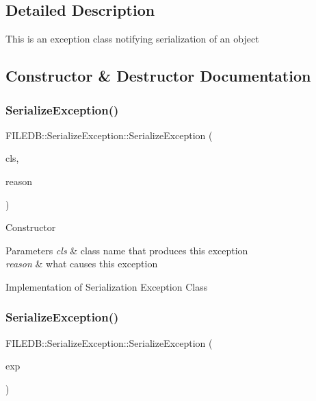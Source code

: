 \subsection{Detailed Description}
This is an exception class notifying serialization of an object 

\subsection{Constructor \& Destructor Documentation}
\mbox{\label{classFILEDB_1_1SerializeException_aab805dbcb5d495f039ec743780e5e1a2}} 
\subsubsection{\texorpdfstring{SerializeException()}{SerializeException()}\hspace{0.1cm}{\footnotesize\ttfamily [1/9]}}
{\footnotesize\ttfamily F\+I\+L\+E\+D\+B\+::\+Serialize\+Exception\+::\+Serialize\+Exception (\begin{DoxyParamCaption}\item[{const std\+::string \&}]{cls,  }\item[{const std\+::string \&}]{reason }\end{DoxyParamCaption})}

Constructor 
\begin{DoxyParams}{Parameters}
{\em cls} & class name that produces this exception \\
\hline
{\em reason} & what causes this exception\\
\hline
\end{DoxyParams}
Implementation of Serialization Exception Class \mbox{\label{classFILEDB_1_1SerializeException_a4583fae246a4b2d2f468c3a4ec0ecb08}} 
\subsubsection{\texorpdfstring{SerializeException()}{SerializeException()}\hspace{0.1cm}{\footnotesize\ttfamily [2/9]}}
{\footnotesize\ttfamily F\+I\+L\+E\+D\+B\+::\+Serialize\+Exception\+::\+Serialize\+Exception (\begin{DoxyParamCaption}\item[{const \mbox{\hyperlink{classFILEDB_1_1SerializeException}{Serialize\+Exception}} \&}]{exp }\end{DoxyParamCaption})}


